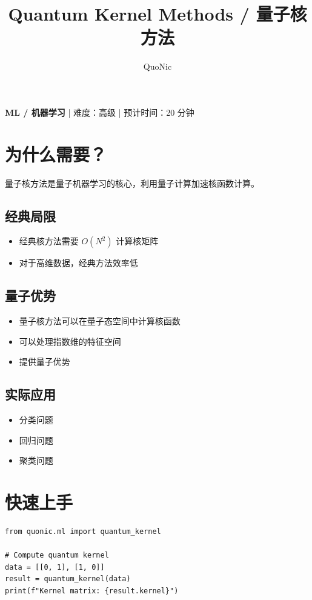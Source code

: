 \documentclass[12pt,a4paper]{article}
\title{Quantum Kernel Methods / 量子核方法}
\author{QuoNic}
\date{}
\begin{document}
\maketitle

\begin{center}
\textbf{ML / 机器学习} | 难度：高级 | 预计时间：20 分钟
\end{center}

\tableofcontents
\newpage

\section{为什么需要？}

量子核方法是量子机器学习的核心，利用量子计算加速核函数计算。

\subsection{经典局限}
\begin{itemize}
  \item 经典核方法需要 $O(N^2)$ 计算核矩阵
  \item 对于高维数据，经典方法效率低
\end{itemize}

\subsection{量子优势}
\begin{itemize}
  \item 量子核方法可以在量子态空间中计算核函数
  \item 可以处理指数维的特征空间
  \item 提供量子优势
\end{itemize}

\subsection{实际应用}
\begin{itemize}
  \item 分类问题
  \item 回归问题
  \item 聚类问题
\end{itemize}

\section{快速上手}

\begin{lstlisting}[style=python]
from quonic.ml import quantum_kernel

# Compute quantum kernel
data = [[0, 1], [1, 0]]
result = quantum_kernel(data)
print(f"Kernel matrix: {result.kernel}")
\end{lstlisting}
\end{document}
